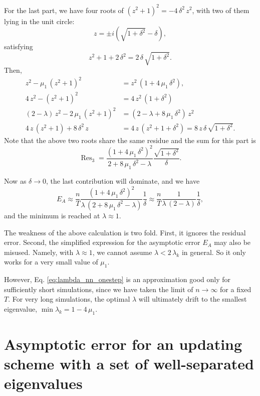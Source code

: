 \documentclass[reprint, floatfix]{revtex4-1}
\newcommand{\Err}{E}
\begin{document}
{For the last part,
we have four roots of
$(z^2 + 1)^2 = - 4 \, \delta^2 \, z^2$,
with two of them lying in the unit circle:
$$
z = \pm i \left( \sqrt{ 1 + \delta^2 } - \delta \right),
$$
satisfying
$$
z^2 + 1 + 2 \, \delta^2 = 2 \, \delta \, \sqrt{1 + \delta^2}.
$$
Then,
$$
\begin{aligned}
z^2 - \mu_1 \, \left( z^2 + 1 \right)^2
&= z^2 \, (1 + 4 \, \mu_1 \, \delta^2),
\\
4 \, z^2 - \left( z^2 + 1 \right)^2
&=
4 \, z^2 \, (1 + \delta^2)
\\
%
(2 - \lambda) \, z^2
- 2 \, \mu_1 \, \left( z^2 + 1 \right)^2
&=
\left(
  2 - \lambda + 8 \, \mu_1 \, \delta^2
\right) \, z^2
\\
%
4 \, z \, \left( z^2 + 1 \right)
+
8 \, \delta^2 \, z
&=
4 \, z \, (z^2 + 1 + \delta^2)
=
8 \, z \, \delta \, \sqrt{ 1 + \delta^2 }.
\end{aligned}
$$
Note that the above two roots share the same
residue and the sum for this part is
$$
\operatorname{Res}_3
=
\frac{ \left( 1 + 4 \, \mu_1 \, \delta^2 \right)^2 }
     {        2 + 8 \, \mu_1 \, \delta^2 - \lambda }
\frac{ \sqrt{ 1 + \delta^2 } }
     {        \delta         }.
$$

Now as $\delta \to 0$, the last contribution will dominate,
and we have
$$
\Err_A
\approx
\frac{ n } { T }
\frac{ (1 + 4 \, \mu_1 \, \delta^2)^2 }
{ \lambda \, (2 + 8 \, \mu_1 \, \delta^2 - \lambda) }
\frac{ 1 } { \delta }
\approx
\frac{ n } { T }
\frac{ 1 }
{ \lambda \, (2 - \lambda) }
\frac{ 1 } { \delta },
$$
and the minimum is reached at $\lambda \approx 1$.

The weakness of the above calculation is two fold.
%
First, it ignores the residual error.
%
Second, the simplified expression for the asymptotic error
$E_A$ may also be misused.
%
Namely, with $\lambda \approx 1$,
we cannot assume $\lambda < 2 \, \lambda_k$ in general.
%
So it only works for a very small value of $\mu_1$.
}



However, Eq. \eqref{eq:lambda_nn_onestep}
is an approximation good only
for sufficiently short simulations,
since we have taken the limit of $n \to \infty$
for a fixed $T$.
%
For very long simulations,
the optimal $\lambda$
will ultimately drift to
the smallest eigenvalue,
$\min \lambda_k = 1 - 4 \, \mu_1$.





\section{\label{sec:upperbound}
Asymptotic error for an updating scheme
with a set of well-separated eigenvalues}
\end{document}
